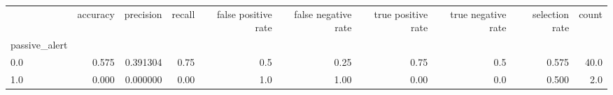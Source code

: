 \begin{tabular}{lrrrrrrrrr}
\toprule
{} &  accuracy &  precision &  recall &  false positive rate &  false negative rate &  true positive rate &  true negative rate &  selection rate &  count \\
passive\_alert &           &            &         &                      &                      &                     &                     &                 &        \\
\midrule
0.0           &     0.575 &   0.391304 &    0.75 &                  0.5 &                 0.25 &                0.75 &                 0.5 &           0.575 &   40.0 \\
1.0           &     0.000 &   0.000000 &    0.00 &                  1.0 &                 1.00 &                0.00 &                 0.0 &           0.500 &    2.0 \\
\bottomrule
\end{tabular}
